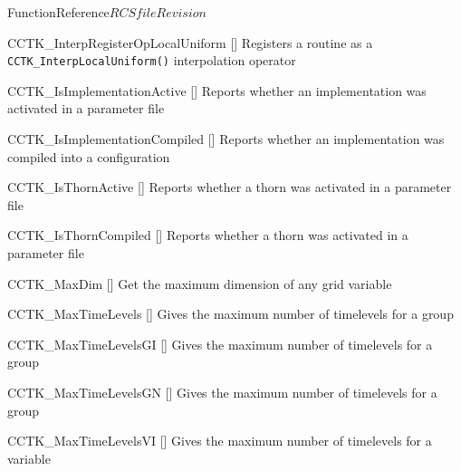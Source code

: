 \begin{cactuspart}{FunctionReference}{$RCSfile$}{$Revision$}
\begin{Lentry}

\item[CCTK\_InterpRegisterOpLocalUniform]
  [\pageref{CCTK-InterpRegisterOpLocalUniform}]
  Registers a routine as a \verb|CCTK_InterpLocalUniform()|
  interpolation operator


\item[CCTK\_IsImplementationActive]
  [\pageref{CCTK-IsImplementationActive}]
  Reports whether an implementation was activated in a parameter file

\item[CCTK\_IsImplementationCompiled]
  [\pageref{CCTK-IsImplementationCompiled}]
  Reports whether an implementation was compiled into a configuration

\item[CCTK\_IsThornActive]
  [\pageref{CCTK-IsThornActive}]
  Reports whether a thorn was activated in a parameter file

\item[CCTK\_IsThornCompiled]
  [\pageref{CCTK-IsThornActive}]
  Reports whether a thorn was activated in a parameter file

\item[CCTK\_MaxDim]
  [\pageref{CCTK-MaxDim}]
  Get the maximum dimension of any grid variable

\item[CCTK\_MaxTimeLevels]
  [\pageref{CCTK-MaxTimeLevels}]
  Gives the maximum number of timelevels for a group

\item[CCTK\_MaxTimeLevelsGI]
  [\pageref{CCTK-MaxTimeLevelsGI}]
  Gives the maximum number of timelevels for a group

\item[CCTK\_MaxTimeLevelsGN]
  [\pageref{CCTK-MaxTimeLevelsGN}]
  Gives the maximum number of timelevels for a group

\item[CCTK\_MaxTimeLevelsVI]
  [\pageref{CCTK-MaxTimeLevelsVarI}]
  Gives the maximum number of timelevels for a variable


\end{Lentry}
\end{cactuspart}
